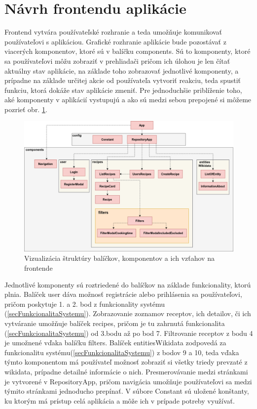 \section{Návrh frontendu aplikácie}
Frontend vytvára používateľské rozhranie a teda umožňuje komunikovať používateľovi s aplikáciou. Grafické rozhranie aplikácie bude pozostávať z viacerých komponentov, ktoré sú v balíčku components. Sú to komponenty, ktoré sa používateľovi môžu zobraziť v prehliadači pričom ich úlohou je len čítať aktuálny stav aplikácie, na základe toho zobrazovať jednotlivé komponenty, a prípadne na základe určitej akcie od používateľa vytvoriť reakciu, teda spustiť funkciu, ktorá dokáže stav aplikácie zmeniť. Pre jednoduchšie priblíženie toho, aké komponenty v aplikácií vystupujú a ako sú medzi sebou prepojené si môžeme pozrieť obr. \ref{reactComponents}. 
\begin{figure}[h]
\includegraphics[width=\textwidth]{images/reactComponents}
\caption{Vizualizácia štruktúry balíčkov, komponentov a ich vzťahov na frontende}
\label{reactComponents}
\end{figure}
Jednotlivé komponenty sú roztriedené do balíčkov na základe funkcionality, ktorú plnia. Balíček user dáva možnosť registrácie alebo prihlásenia sa používateľovi, pričom poskytuje 1. a 2. bod z funkcionality systému (\ref{secFunkcionalitaSystemu}). Zobrazovanie zoznamov receptov, ich detailov, či ich vytváranie umožňuje balíček recipes, pričom je tu zahrnutá funkcionalita (\ref{secFunkcionalitaSystemu}) od 3.bodu až po bod 7. Filtrovanie receptov z bodu 4 je umožnené vďaka balíčku filters. Balíček entitiesWikidata zodpovedá za funkcionalitu systému(\ref{secFunkcionalitaSystemu}) z bodov 9 a 10, teda vďaka týmto komponentom má používateľ možnosť zobraziť si všetky triedy prevzaté z wikidata, prípadne detailné informácie o nich. Presmerovávanie medzi stránkami je vytvorené v RepositoryApp, pričom navigácia umožňuje používateľovi sa medzi týmito stránkami jednoducho prepínať. V súbore Constant sú uložené konštanty, ku ktorým má prístup celá aplikácia a môže ich v prípade potreby využívať. 


